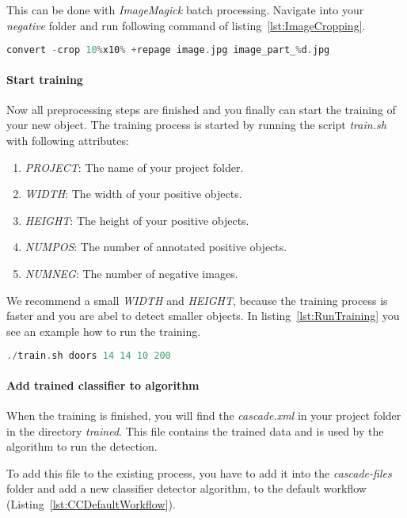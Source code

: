 This can be done with \textit{ImageMagick} batch processing. Navigate into your \textit{negative} folder and run following command of listing~\ref{lst:ImageCropping}.

\begin{lstlisting}[caption={Image cropping.}, label={lst:ImageCropping}, language=Kotlin, escapechar=$]
convert -crop 10%x10% +repage image.jpg image_part_%d.jpg
\end{lstlisting}

\paragraph{Start training}
Now all preprocessing steps are finished and you finally can start the training of your new object. The training process is started by running the script \textit{train.sh} with following attributes:

\begin{enumerate}
    \item \textit{PROJECT}: The name of your project folder.
    \item \textit{WIDTH}: The width of your positive objects.
    \item \textit{HEIGHT}: The height of your positive objects.
    \item \textit{NUMPOS}: The number of annotated positive objects.
    \item \textit{NUMNEG}: The number of negative images.
\end{enumerate}

We recommend a small \textit{WIDTH} and \textit{HEIGHT}, because the training process is faster and you are abel to detect smaller objects. In listing~\ref{lst:RunTraining} you see an example how to run the training.

\begin{lstlisting}[caption={Run training.}, label={lst:RunTraining}, language=Kotlin, escapechar=$]
./train.sh doors 14 14 10 200
\end{lstlisting}

\paragraph{Add trained classifier to algorithm}
When the training is finished, you will find the \textit{cascade.xml} in your project folder in the directory \textit{trained}. This file contains the trained data and is used by the algorithm to run the detection.

To add this file to the existing process, you have to add it into the \textit{cascade-files} folder and add a new classifier detector algorithm, to the default workflow (Listing~\ref{lst:CCDefaultWorkflow}).

